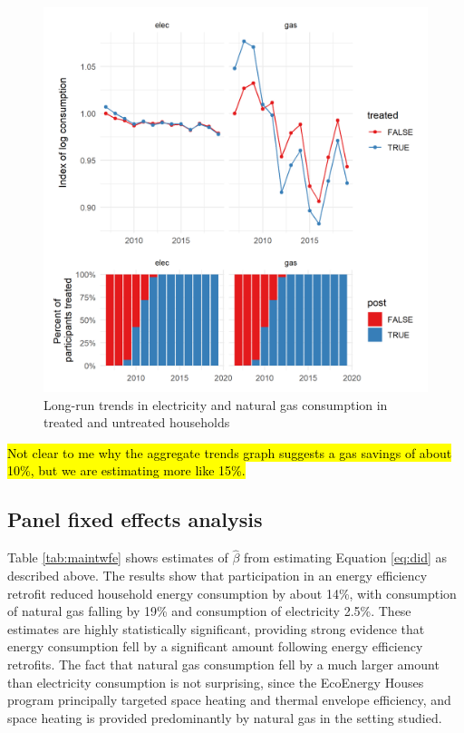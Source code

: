 \documentclass{article}
\newcommand{\hlc}[2][yellow]{ {\sethlcolor{#1} \hl{#2}} }
\begin{document}
\begin{figure}
	\includegraphics{../output_figures_tables/aggregate_trend_graph}
	\caption{Long-run trends in electricity and natural gas consumption in treated and untreated households}\label{fig_agg}
\end{figure}

\hlc{Not clear to me why the aggregate trends graph suggests a gas savings of about 10\%, but we are estimating more like 15\%.}

\subsection{Panel fixed effects analysis}
Table \ref{tab:maintwfe} shows estimates of $\hat{\beta}$ from estimating Equation \eqref{eq:did} as described above. The results show that participation in an energy efficiency retrofit reduced household energy consumption by about 14\%, with consumption of natural gas falling by 19\% and consumption of electricity 2.5\%. These estimates are highly statistically significant, providing strong evidence that energy consumption fell by a significant amount following energy efficiency retrofits. The fact that natural gas consumption fell by a much larger amount than electricity consumption is not surprising, since the EcoEnergy Houses program principally targeted space heating and thermal envelope efficiency, and space heating is provided predominantly by natural gas in the setting studied.  
\end{document}
